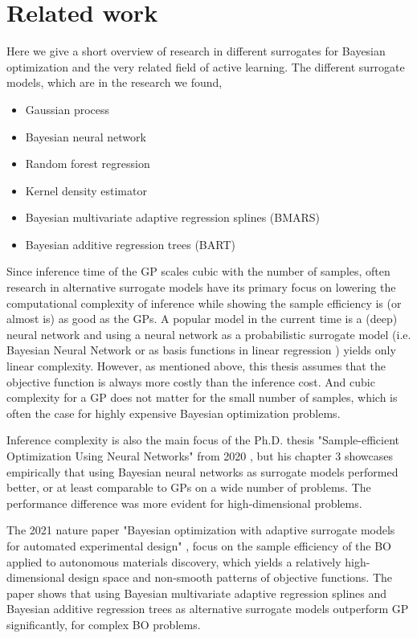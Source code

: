 \section{Related work}
Here we give a short overview of research in different surrogates for Bayesian optimization
and the very related field of active learning. The different surrogate models, which are in the 
research we found, 
\begin{itemize}[noitemsep]
    \item Gaussian process
    \item Bayesian neural network
    \item Random forest regression
    \item Kernel density estimator
    \item Bayesian multivariate adaptive regression splines (BMARS)
    \item Bayesian additive regression trees (BART)
\end{itemize}

Since inference time of the GP scales cubic with the number of samples, often research in
alternative surrogate models have its primary focus on lowering the computational complexity of
inference while showing the sample efficiency is (or almost is) as good as the GPs. A popular model
in the current time is a (deep) neural network and using a neural network as a probabilistic
surrogate model (i.e. Bayesian Neural Network \cite{BOHAMIANN} or as basis functions in linear
regression \cite{DNGO}) yields only linear complexity. However, as mentioned above, this thesis
assumes that the objective function is always more costly than the inference cost. And cubic
complexity for a GP does not matter for the small number of samples, which is often the case for
highly expensive Bayesian optimization problems. 

Inference complexity is also the main focus of the Ph.D. thesis "Sample-efficient Optimization Using
Neural Networks" from 2020 \cite{PhDthesis}, but his chapter 3 showcases empirically that using Bayesian
neural networks as surrogate models performed better, or at least comparable to GPs on a wide number
of problems. The performance difference was more evident for high-dimensional problems.

The 2021 nature paper "Bayesian optimization with adaptive surrogate models for automated experimental design"
\cite{Nature_BO_paper}, focus on the sample efficiency of the BO applied to autonomous materials discovery, 
which yields a relatively high-dimensional design space and non-smooth patterns of objective functions.  
The paper shows that using Bayesian multivariate adaptive regression splines
and Bayesian additive regression trees as alternative surrogate models outperform GP significantly, 
for complex BO problems. 


